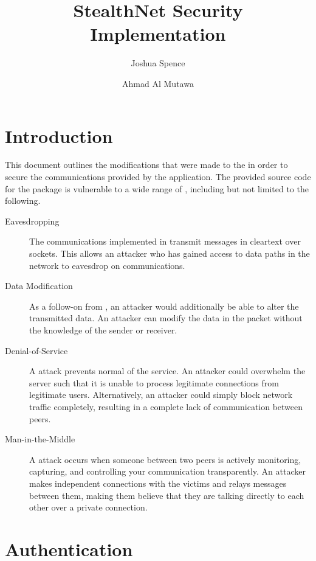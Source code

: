\documentclass[a4paper,11pt]{article}
\title{StealthNet Security Implementation}
\author{Joshua Spence \and Ahmad Al Mutawa}
\date{}
\begin{document}
\maketitle

\section{Introduction}
This document outlines the modifications that were made to the \packageName{} in
order to secure the communications provided by the application. The provided
source code for the \packageName{} package is vulnerable to a wide range of 
, including but not limited to the following.

\begin{description}

\item[Eavesdropping] The communications implemented in \packageName{} transmit
messages in cleartext over sockets. This allows an attacker who has gained 
access to data paths in the network to eavesdrop on \packageName{} 
communications.

\item[Data Modification] As a follow-on from , an 
attacker would additionally be able to alter the transmitted data. An attacker
can modify the data in the packet without the knowledge of the sender or 
receiver.

\item[Denial-of-Service] A  attack prevents normal
of the \serviceName{} service. An attacker could overwhelm the \serviceName{} 
server such that it is unable to process legitimate connections from legitimate 
users. Alternatively, an attacker could simply block network traffic completely,
resulting in a complete lack of communication between \serviceName{} peers.

\item[Man-in-the-Middle] A  attack occurs when 
someone between two \serviceName{} peers is actively monitoring, capturing, and 
controlling your communication transparently. An attacker makes independent 
connections with the victims and relays messages between them, making them 
believe that they are talking directly to each other over a private connection.

\end{description}

\section{Authentication}
\end{document}
